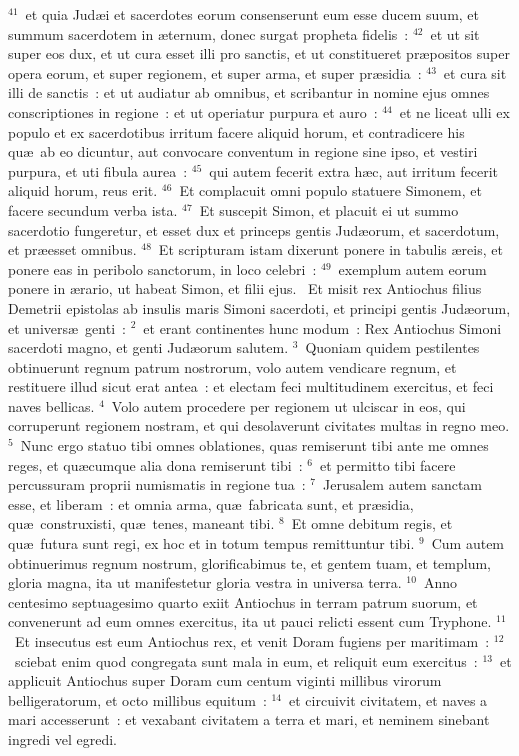 ${}^{41}$~et quia Jud\ae i et sacerdotes eorum consenserunt eum esse ducem suum, et summum sacerdotem in \ae ternum, donec surgat propheta fidelis~:
${}^{42}$~et ut sit super eos dux, et ut cura esset illi pro sanctis, et ut constitueret pr\ae positos super opera eorum, et super regionem, et super arma, et super pr\ae sidia~:
${}^{43}$~et cura sit illi de sanctis~: et ut audiatur ab omnibus, et scribantur in nomine ejus omnes conscriptiones in regione~: et ut operiatur purpura et auro~:
${}^{44}$~et ne liceat ulli ex populo et ex sacerdotibus irritum facere aliquid horum, et contradicere his qu\ae\ ab eo dicuntur, aut convocare conventum in regione sine ipso, et vestiri purpura, et uti fibula aurea~:
${}^{45}$~qui autem fecerit extra h\ae c, aut irritum fecerit aliquid horum, reus erit.
${}^{46}$~Et complacuit omni populo statuere Simonem, et facere secundum verba ista.
${}^{47}$~Et suscepit Simon, et placuit ei ut summo sacerdotio fungeretur, et esset dux et princeps gentis Jud\ae orum, et sacerdotum, et pr\ae esset omnibus.
${}^{48}$~Et scripturam istam dixerunt ponere in tabulis \ae reis, et ponere eas in peribolo sanctorum, in loco celebri~:
${}^{49}$~exemplum autem eorum ponere in \ae rario, ut habeat Simon, et filii ejus.
~Et misit rex Antiochus filius Demetrii epistolas ab insulis maris Simoni sacerdoti, et principi gentis Jud\ae orum, et univers\ae\ genti~:
${}^{2}$~et erant continentes hunc modum~: Rex Antiochus Simoni sacerdoti magno, et genti Jud\ae orum salutem.
${}^{3}$~Quoniam quidem pestilentes obtinuerunt regnum patrum nostrorum, volo autem vendicare regnum, et restituere illud sicut erat antea~: et electam feci multitudinem exercitus, et feci naves bellicas.
${}^{4}$~Volo autem procedere per regionem ut ulciscar in eos, qui corruperunt regionem nostram, et qui desolaverunt civitates multas in regno meo.
${}^{5}$~Nunc ergo statuo tibi omnes oblationes, quas remiserunt tibi ante me omnes reges, et qu\ae cumque alia dona remiserunt tibi~:
${}^{6}$~et permitto tibi facere percussuram proprii numismatis in regione tua~:
${}^{7}$~Jerusalem autem sanctam esse, et liberam~: et omnia arma, qu\ae\ fabricata sunt, et pr\ae sidia, qu\ae\ construxisti, qu\ae\ tenes, maneant tibi.
${}^{8}$~Et omne debitum regis, et qu\ae\ futura sunt regi, ex hoc et in totum tempus remittuntur tibi.
${}^{9}$~Cum autem obtinuerimus regnum nostrum, glorificabimus te, et gentem tuam, et templum, gloria magna, ita ut manifestetur gloria vestra in universa terra.
${}^{10}$~Anno centesimo septuagesimo quarto exiit Antiochus in terram patrum suorum, et convenerunt ad eum omnes exercitus, ita ut pauci relicti essent cum Tryphone.
${}^{11}$~Et insecutus est eum Antiochus rex, et venit Doram fugiens per maritimam~:
${}^{12}$~sciebat enim quod congregata sunt mala in eum, et reliquit eum exercitus~:
${}^{13}$~et applicuit Antiochus super Doram cum centum viginti millibus virorum belligeratorum, et octo millibus equitum~:
${}^{14}$~et circuivit civitatem, et naves a mari accesserunt~: et vexabant civitatem a terra et mari, et neminem sinebant ingredi vel egredi.


